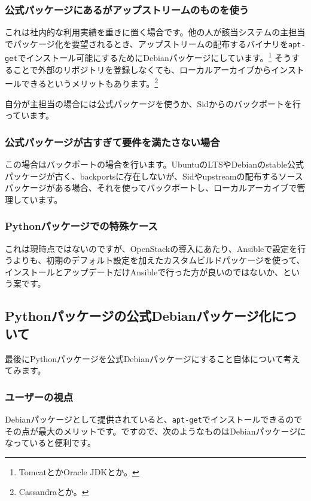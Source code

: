 \documentclass[mingoth,a4paper]{jsarticle}
\begin{document}
\subsubsection{公式パッケージにあるがアップストリームのものを使う}

これは社内的な利用実績を重きに置く場合です。他の人が該当システムの主担当でパッケージ化を要望されるとき、アップストリームの配布するバイナリを\texttt{apt-get}でインストール可能にするためにDebianパッケージにしています。\footnote{TomcatとかOracle JDKとか。}
そうすることで外部のリポジトリを登録しなくても、ローカルアーカイブからインストールできるというメリットもあります。\footnote{Cassandraとか。}

自分が主担当の場合には公式パッケージを使うか、Sidからのバックポートを行っています。

\subsubsection{公式パッケージが古すぎて要件を満たさない場合}

この場合はバックポートの場合を行います。UbuntuのLTSやDebianのstable公式パッケージが古く、backportsに存在しないが、Sidやupstreamの配布するソースパッケージがある場合、それを使ってバックポートし、ローカルアーカイブで管理しています。

\subsubsection{Pythonパッケージでの特殊ケース}

これは現時点ではないのですが、OpenStackの導入にあたり、Ansibleで設定を行うよりも、初期のデフォルト設定を加えたカスタムビルドパッケージを使って、インストールとアップデートだけAnsibleで行った方が良いのではないか、という案です。

\subsection{Pythonパッケージの公式Debianパッケージ化について}

最後にPythonパッケージを公式Debianパッケージにすること自体について考えてみます。

\subsubsection{ユーザーの視点}
Debianパッケージとして提供されていると、\texttt{apt-get}でインストールできるのでその点が最大のメリットです。ですので、次のようなものはDebianパッケージになっていると便利です。
\end{document}
